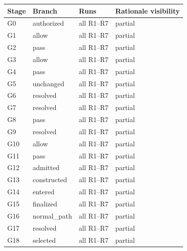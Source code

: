 \begin{tabularx}{\linewidth}{@{}l l l X@{}}
\toprule
Stage & Branch & Runs & Rationale visibility \\
\midrule
G0 & authorized & all R1--R7 & partial \\
G1 & allow & all R1--R7 & partial \\
G2 & pass & all R1--R7 & partial \\
G3 & allow & all R1--R7 & partial \\
G4 & pass & all R1--R7 & partial \\
G5 & unchanged & all R1--R7 & partial \\
G6 & resolved & all R1--R7 & partial \\
G7 & resolved & all R1--R7 & partial \\
G8 & pass & all R1--R7 & partial \\
G9 & resolved & all R1--R7 & partial \\
G10 & allow & all R1--R7 & partial \\
G11 & pass & all R1--R7 & partial \\
G12 & admitted & all R1--R7 & partial \\
G13 & constructed & all R1--R7 & partial \\
G14 & entered & all R1--R7 & partial \\
G15 & finalized & all R1--R7 & partial \\
G16 & normal\_path & all R1--R7 & partial \\
G17 & resolved & all R1--R7 & partial \\
G18 & selected & all R1--R7 & partial \\
\bottomrule
\end{tabularx}
